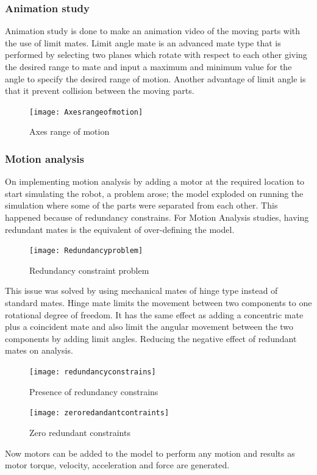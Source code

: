 \bigskip
\subsubsection{Animation study} 
Animation study is done to make an animation video of the moving parts with the use of limit mates. Limit angle mate is an advanced mate type that is performed by selecting two planes which rotate with respect to each other giving the desired range to mate and input a maximum and minimum value for the angle to specify the desired range of motion. Another advantage of limit angle is that it prevent collision between the moving parts.

\begin{figure}[H]
	\centering
	\texttt{[image: Axesrangeofmotion]}
	\caption{Axes range of motion}
\end{figure}

\bigskip
\subsubsection{Motion analysis}
On implementing motion analysis by adding a motor at the required location to start simulating the robot, a problem arose; the model exploded on running the simulation where some of the parts were separated from each other. This happened because of redundancy constrains. For Motion Analysis studies, having redundant mates is the equivalent of over-defining the model.  

\begin{figure}[H]
	\centering
	\texttt{[image: Redundancyproblem]}
	\caption{Redundancy constraint problem}
\end{figure}

This issue was solved by using mechanical mates of hinge type instead of standard mates. Hinge mate limits the movement between two components to one rotational degree of freedom. It has the same effect as adding a concentric mate plus a coincident mate and also limit the angular movement between the two components by adding limit angles. Reducing the negative effect of redundant mates on analysis.

\begin{figure}[H]
	\centering
	\texttt{[image: redundancyconstrains]}
	\caption{Presence of redundancy constrains}
\end{figure}

\begin{figure}[H]
	\centering
	\texttt{[image: zeroredandantcontraints]}
	\caption{Zero redundant constraints}
\end{figure}
\smallskip
Now motors can be added to the model to perform any motion and results as motor torque, velocity, acceleration and force are generated.

